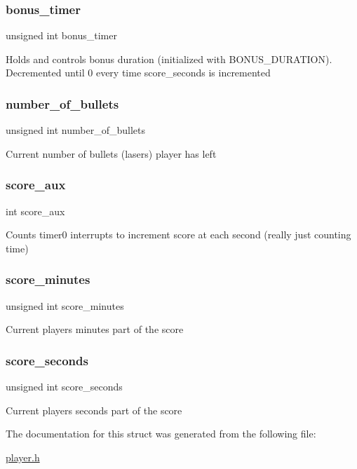 \subsubsection{\texorpdfstring{bonus\+\_\+timer}{bonus\_timer}}
{\footnotesize\ttfamily unsigned int bonus\+\_\+timer}

Holds and controls bonus duration (initialized with B\+O\+N\+U\+S\+\_\+\+D\+U\+R\+A\+T\+I\+ON). Decremented until 0 every time score\+\_\+seconds is incremented \hypertarget{struct_player_a391d726f640974bcd70eeba097a92ebf}{}\label{struct_player_a391d726f640974bcd70eeba097a92ebf} 
\subsubsection{\texorpdfstring{number\+\_\+of\+\_\+bullets}{number\_of\_bullets}}
{\footnotesize\ttfamily unsigned int number\+\_\+of\+\_\+bullets}

Current number of bullets (lasers) player has left \hypertarget{struct_player_aa7c2d82515de928df40dec915c3ba081}{}\label{struct_player_aa7c2d82515de928df40dec915c3ba081} 
\subsubsection{\texorpdfstring{score\+\_\+aux}{score\_aux}}
{\footnotesize\ttfamily int score\+\_\+aux}

Counts timer0 interrupts to increment score at each second (really just counting time) \hypertarget{struct_player_a9ebf860aa3d67f9f3229afa365dbd2df}{}\label{struct_player_a9ebf860aa3d67f9f3229afa365dbd2df} 
\subsubsection{\texorpdfstring{score\+\_\+minutes}{score\_minutes}}
{\footnotesize\ttfamily unsigned int score\+\_\+minutes}

Current player\textquotesingle{}s minutes part of the score \hypertarget{struct_player_ac5b57794eda52960699e7304de9ed640}{}\label{struct_player_ac5b57794eda52960699e7304de9ed640} 
\subsubsection{\texorpdfstring{score\+\_\+seconds}{score\_seconds}}
{\footnotesize\ttfamily unsigned int score\+\_\+seconds}

Current player\textquotesingle{}s seconds part of the score 

The documentation for this struct was generated from the following file\+:\begin{DoxyCompactItemize}
\item 
\hyperlink{player_8h}{player.\+h}\end{DoxyCompactItemize}
